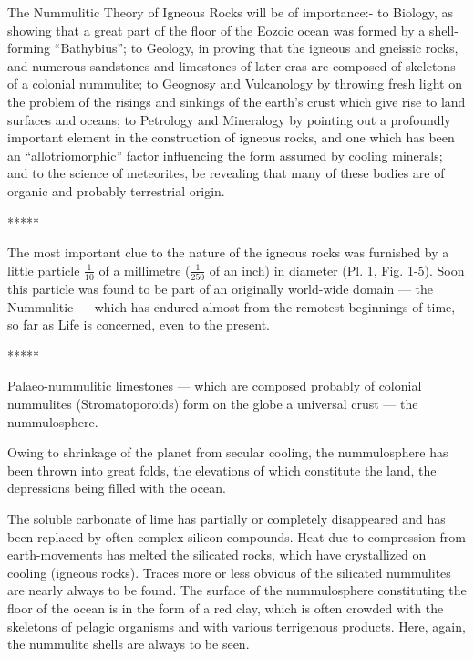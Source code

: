 \documentclass[a4paper, 12pt, oneside]{article}
\begin{document}
The Nummulitic Theory of Igneous Rocks will be of importance:- to Biology, as showing that a great part of the floor of the Eozoic ocean was formed by a shell-forming ``Bathybius''; to Geology, in proving that the igneous and gneissic rocks, and numerous sandstones and limestones of later eras are composed of skeletons of a colonial nummulite; to Geognosy and Vulcanology by throwing fresh light on the problem of the risings and sinkings of the earth's crust which give rise to land surfaces and oceans; to Petrology and Mineralogy by pointing out a profoundly important element in the construction of igneous rocks, and one which has been an ``allotriomorphic'' factor influencing the form assumed by cooling minerals; and to the science of meteorites, be revealing that many of these bodies are of organic and probably terrestrial origin.

\centerline{*\hspace{15mm}*\hspace{15mm}*\hspace{15mm}*\hspace{15mm}*}
\bigskip

The most important clue to the nature of the igneous rocks was furnished by a little particle $\frac{1}{10}$ of a millimetre ($\frac{1}{250}$ of an inch) in diameter (Pl. 1, Fig. 1-5). Soon this particle was found to be part of an originally world-wide domain --- the Nummulitic --- which has endured almost from the remotest beginnings of time, so far as Life is concerned, even to the present.

\centerline{*\hspace{15mm}*\hspace{15mm}*\hspace{15mm}*\hspace{15mm}*}
\bigskip

Palaeo-nummulitic limestones --- which are composed probably of colonial nummulites (Stromatoporoids) form on the globe a universal crust --- the nummulosphere.

Owing to shrinkage of the planet from secular cooling, the nummulosphere has been thrown into great folds, the elevations of which constitute the land, the depressions being filled with the ocean.

The soluble carbonate of lime has partially or completely disappeared and has been replaced by often complex silicon compounds. Heat due to compression from earth-movements has melted the silicated rocks, which have crystallized on cooling (igneous rocks). Traces more or less obvious of the silicated nummulites are nearly always to be found. The surface of the nummulosphere constituting the floor of the ocean is in the form of a red clay, which is often crowded with the skeletons of pelagic organisms and with various terrigenous products. Here, again, the nummulite shells are always to be seen.
\end{document}
